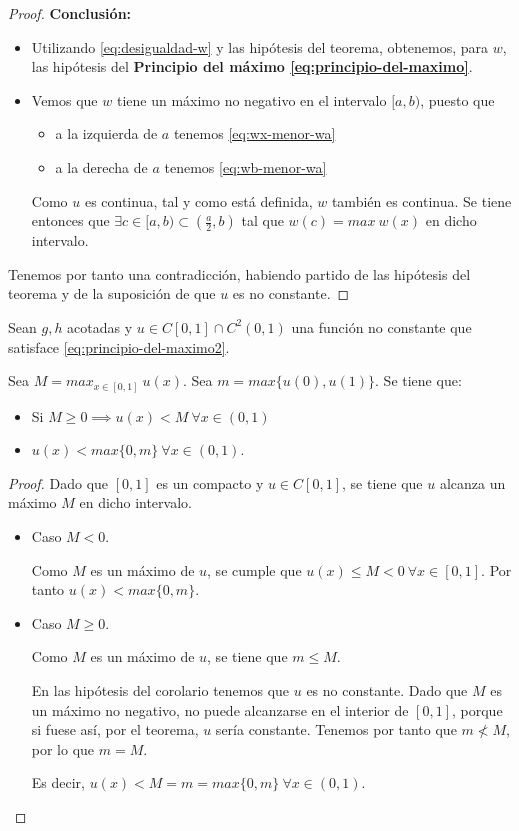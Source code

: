 \begin{proof}
\noindent\textbf{Conclusión:}
\begin{itemize}
\item Utilizando \eqref{eq:desigualdad-w} y las hipótesis del teorema, obtenemos, para $w$, las hipótesis del \textbf{Principio del máximo \eqref{eq:principio-del-maximo}}.
\item Vemos que $w$ tiene un máximo no negativo en el intervalo $[a, b)$, puesto que
\begin{itemize}
\item a la izquierda de $a$ tenemos \eqref{eq:wx-menor-wa}
\item a la derecha de $a$ tenemos \eqref{eq:wb-menor-wa}
\end{itemize}
Como $u$ es continua, tal y como está definida, $w$ también es continua. Se tiene entonces que $\exists c \in [a, b) \subset (\frac{a}{2}, b)$ tal que $w(c) = max\ w(x)$ en dicho intervalo.
\end{itemize}

Tenemos por tanto una contradicción, habiendo partido de las hipótesis del teorema y de la suposición de que $u$ es no constante.
\end{proof}

\corol
Sean $g,h$ acotadas y $u\in C[0,1] \cap C^2(0,1)$ una función no constante que satisface \eqref{eq:principio-del-maximo2}. 

Sea $M = max_{x \in [0,1]}\ u(x)$. Sea $m = max\{u(0), u(1)\}$. Se tiene que:
\begin{itemize}
\item Si $M \ge 0 \implies u(x) < M\ \forall x\in(0,1)$
\item $u(x) < max\{0,m\}\ \forall x\in(0,1)$.
\end{itemize}

\begin{proof}
Dado que $[0,1]$ es un compacto y $u\in C[0,1]$, se tiene que $u$ alcanza un máximo $M$ en dicho intervalo.

\begin{itemize}
\item Caso $M<0$.

Como $M$ es un máximo de $u$, se cumple que $u(x) \le M < 0\ \forall x\in[0,1]$. Por tanto $u(x) < max\{0, m\}$.

\item Caso $M\ge 0$. 

Como $M$ es un máximo de $u$, se tiene que $m \le M$.

En las hipótesis del corolario tenemos que $u$ es no constante. Dado que $M$ es un máximo no negativo, no puede alcanzarse en el interior de $[0,1]$, porque si fuese así, por el teorema, $u$ sería constante. Tenemos por tanto que $m \nless M$, por lo que $m = M$.

Es decir, $u(x) < M = m = max\{0, m\}\ \forall x\in (0,1)$.
\end{itemize}
\end{proof}

